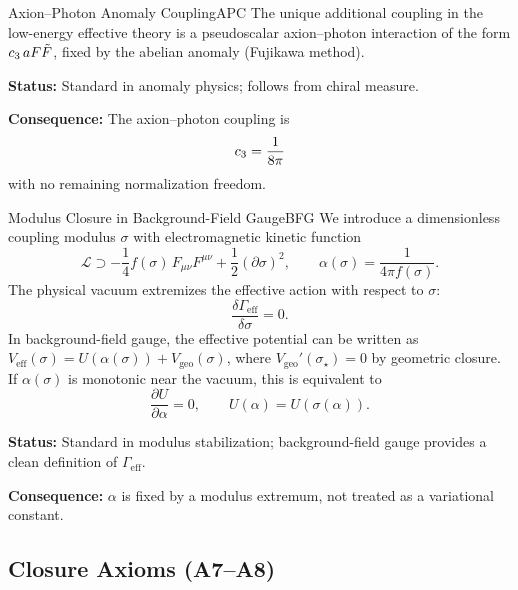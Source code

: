 \begin{axiom}{Axion--Photon Anomaly Coupling}{APC}
The unique additional coupling in the low-energy effective theory is a 
pseudoscalar axion--photon interaction of the form $c_3\, a F\tilde{F}$, 
fixed by the abelian anomaly (Fujikawa method).

\tcblower
\textbf{Status:} Standard in anomaly physics; follows from chiral measure.

\textbf{Consequence:} The axion--photon coupling is
\begin{equation}
    c_3 = \frac{1}{8\pi}
\end{equation}
with no remaining normalization freedom.
\end{axiom}

\begin{axiom}{Modulus Closure in Background-Field Gauge}{BFG}
We introduce a dimensionless coupling modulus $\sigma$ with electromagnetic kinetic function
\begin{equation}
    \mathcal{L} \supset -\frac{1}{4} f(\sigma)\,F_{\mu\nu}F^{\mu\nu}
    + \frac{1}{2}(\partial\sigma)^2,
    \qquad 
    \alpha(\sigma)=\frac{1}{4\pi f(\sigma)}.
\end{equation}
The physical vacuum extremizes the effective action with respect to $\sigma$:
\begin{equation}
    \frac{\delta\Gamma_{\mathrm{eff}}}{\delta\sigma}=0.
\end{equation}
In background-field gauge, the effective potential can be written as
$V_{\mathrm{eff}}(\sigma)=U(\alpha(\sigma)) + V_{\mathrm{geo}}(\sigma)$, where
$V_{\mathrm{geo}}'(\sigma_\star)=0$ by geometric closure.
If $\alpha(\sigma)$ is monotonic near the vacuum, this is equivalent to
\begin{equation}
    \frac{\partial U}{\partial \alpha}=0,
    \qquad U(\alpha)=U(\sigma(\alpha)).
\end{equation}

\tcblower
\textbf{Status:} Standard in modulus stabilization; background-field gauge provides a clean definition of $\Gamma_{\mathrm{eff}}$.

\textbf{Consequence:} $\alpha$ is fixed by a modulus extremum, not treated as a variational constant.
\end{axiom}

\subsection{Closure Axioms (A7--A8)}

